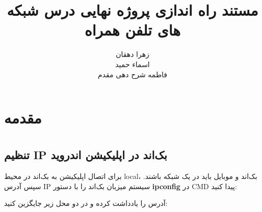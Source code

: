 \documentclass{report}
\title{مستند راه اندازی پروژه نهایی درس شبکه های تلفن همراه}
\author{زهرا دهقان\\اسماء حمید\\فاطمه شرح دهی مقدم}
\begin{document}
\Godpage
\maketitle
{}
\tableofcontents


\chapter{مقدمه}








\chapter{ }

\chapter{ }

\chapter{ }

\section{تنظیم IP بک‌اند در اپلیکیشن اندروید}


برای اتصال اپلیکیشن به بک‌اند در محیط local، بک‌اند و موبایل باید در یک شبکه باشند. سپس آدرس IP سیستم میزبان بک‌اند را با دستور \textbf{ipconfig} در CMD پیدا کنید:

\vspace{0.3cm}

آدرس  را یادداشت کرده و در دو محل زیر جایگزین کنید:
\end{document}
